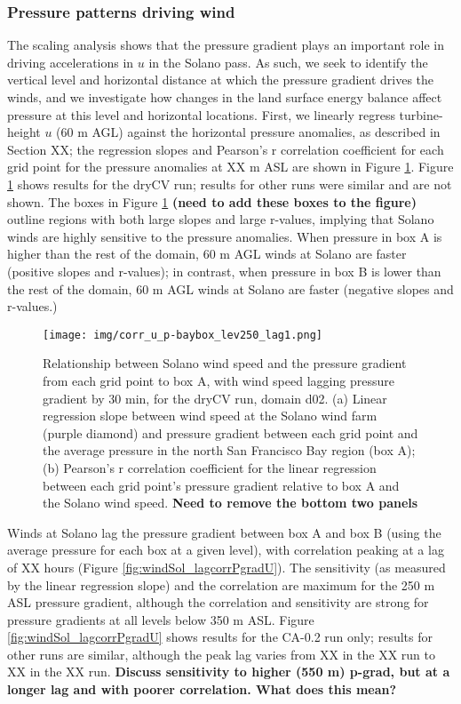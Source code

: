 \subsubsection{Pressure patterns driving wind}

The scaling analysis shows that the pressure gradient plays an important role in driving accelerations in $u$ in the Solano pass.  As such, we seek to identify the vertical level and horizontal distance at which the pressure gradient drives the winds, and we investigate how changes in the land surface energy balance affect pressure at this level and horizontal locations.  First, we linearly regress turbine-height $u$ (60 m AGL) against the horizontal pressure anomalies, as described in Section XX; the regression slopes and Pearson's r correlation coefficient for each grid point for the pressure anomalies at XX m ASL are shown in Figure \ref{fig:windSol_corrPgradUmap}.  Figure \ref{fig:windSol_corrPgradUmap} shows results for the dryCV run; results for other runs were similar and are not shown.  The boxes in Figure \ref{fig:windSol_corrPgradUmap} \textbf{(need to add these boxes to the figure)} outline regions with both large slopes and large r-values, implying that Solano winds are highly sensitive to the pressure anomalies.  When pressure in box A is higher than the rest of the domain, 60 m AGL winds at Solano are faster (positive slopes and r-values); in contrast, when pressure in box B is lower than the rest of the domain, 60 m AGL winds at Solano are faster (negative slopes and r-values.)

\begin{figure}[here]
\texttt{[image: img/corr\_u\_p-baybox\_lev250\_lag1.png]}
\caption{Relationship between Solano wind speed and the pressure gradient from each grid point to box A, with wind speed lagging pressure gradient by 30 min, for the dryCV run, domain d02.  (a) Linear regression slope between wind speed at the Solano wind farm (purple diamond) and pressure gradient between each grid point and the average pressure in the north San Francisco Bay region (box A); (b) Pearson's r correlation coefficient for the linear regression between each grid point's pressure gradient relative to box A and the Solano wind speed.  \textbf{Need to remove the bottom two panels}}
\label{fig:windSol_corrPgradUmap}
\end{figure}

Winds at Solano lag the pressure gradient between box A and box B (using the average pressure for each box at a given level), with correlation peaking at a lag of XX hours (Figure \ref{fig:windSol_lagcorrPgradU}).  The sensitivity (as measured by the linear regression slope) and the correlation are maximum for the 250 m ASL pressure gradient, although the correlation and sensitivity are strong for pressure gradients at all levels below 350 m ASL.  Figure \ref{fig:windSol_lagcorrPgradU} shows results for the CA-0.2 run only; results for other runs are similar, although the peak lag varies from XX in the XX run to XX in the XX run.  \textbf{Discuss sensitivity to higher (550 m) p-grad, but at a longer lag and with poorer correlation.  What does this mean?}

